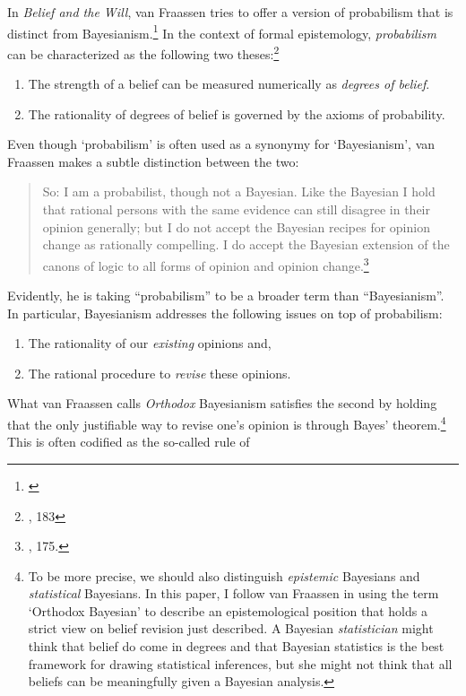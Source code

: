 In \emph{Belief and the Will}, van Fraassen tries to offer a version of
probabilism that is distinct from Bayesianism.\footnote{\cite{beliefwill}} In the context of formal
epistemology, \emph{probabilism} can be characterized as the following
two theses:\footnote{\cite{erikssonhajek}, 183}

\begin{enumerate}
\tightlist
\item
  The strength of a belief can be measured numerically as \emph{degrees
  of belief}.
\item
  The rationality of degrees of belief is governed by the axioms of
  probability.
\end{enumerate}

Even though `probabilism' is often used as a synonymy for `Bayesianism',
van Fraassen makes a subtle distinction between the two:

\begin{quote}
So: I am a probabilist, though not a Bayesian. Like the Bayesian I hold
that rational persons with the same evidence can still disagree in their
opinion generally; but I do not accept the Bayesian recipes for opinion
change as rationally compelling. I do accept the Bayesian extension of
the canons of logic to all forms of opinion and opinion
change.\footnote{\cite{bvflaws}, 175.}
\end{quote}

Evidently, he is taking ``probabilism'' to be a broader term than
``Bayesianism''. In particular, Bayesianism addresses the following
issues on top of probabilism:

\begin{enumerate}
\tightlist
\item
  The rationality of our \emph{existing} opinions and,
\item
  The rational procedure to \emph{revise} these opinions.
\end{enumerate}

What van Fraassen calls \emph{Orthodox} Bayesianism satisfies the second
by holding that the only justifiable way to revise one's opinion is
through Bayes' theorem.\footnote{To be more precise, we should also
  distinguish \emph{epistemic} Bayesians and \emph{statistical}
  Bayesians. In this paper, I follow van Fraassen in using the term
  `Orthodox Bayesian' to describe an epistemological position that holds
  a strict view on belief revision just described. A Bayesian
  \emph{statistician} might think that belief do come in degrees and
  that Bayesian statistics is the best framework for drawing statistical
  inferences, but she might not think that all beliefs can be
  meaningfully given a Bayesian analysis.} This is often codified as the
so-called rule of

